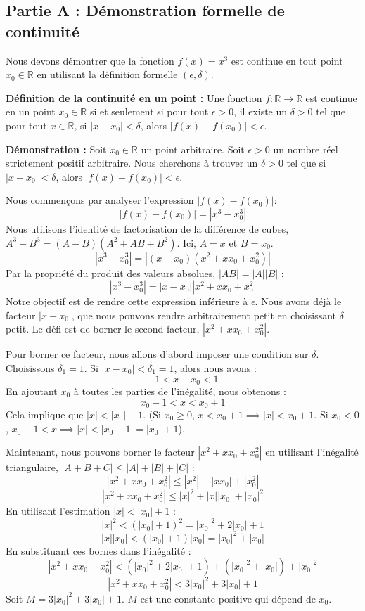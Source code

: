 \documentclass[12pt,a4paper]{report}
\begin{document}
\subsection{Partie A : Démonstration formelle de continuité}

Nous devons démontrer que la fonction $f(x) = x^3$ est continue en tout point $x_0 \in \mathbb{R}$ en utilisant la définition formelle $(\epsilon, \delta)$.

\textbf{Définition de la continuité en un point :}
Une fonction $f: \mathbb{R} \to \mathbb{R}$ est continue en un point $x_0 \in \mathbb{R}$ si et seulement si pour tout $\epsilon > 0$, il existe un $\delta > 0$ tel que pour tout $x \in \mathbb{R}$, si $|x - x_0| < \delta$, alors $|f(x) - f(x_0)| < \epsilon$.

\textbf{Démonstration :}
Soit $x_0 \in \mathbb{R}$ un point arbitraire.
Soit $\epsilon > 0$ un nombre réel strictement positif arbitraire. Nous cherchons à trouver un $\delta > 0$ tel que si $|x - x_0| < \delta$, alors $|f(x) - f(x_0)| < \epsilon$.

Nous commençons par analyser l'expression $|f(x) - f(x_0)|$:
$$ |f(x) - f(x_0)| = |x^3 - x_0^3| $$
Nous utilisons l'identité de factorisation de la différence de cubes, $A^3 - B^3 = (A - B)(A^2 + AB + B^2)$. Ici, $A=x$ et $B=x_0$.
$$ |x^3 - x_0^3| = |(x - x_0)(x^2 + x x_0 + x_0^2)| $$
Par la propriété du produit des valeurs absolues, $|AB| = |A||B|$ :
$$ |x^3 - x_0^3| = |x - x_0| |x^2 + x x_0 + x_0^2| $$
Notre objectif est de rendre cette expression inférieure à $\epsilon$. Nous avons déjà le facteur $|x - x_0|$, que nous pouvons rendre arbitrairement petit en choisissant $\delta$ petit. Le défi est de borner le second facteur, $|x^2 + x x_0 + x_0^2|$.

Pour borner ce facteur, nous allons d'abord imposer une condition sur $\delta$. Choisissons $\delta_1 = 1$.
Si $|x - x_0| < \delta_1 = 1$, alors nous avons :
$$ -1 < x - x_0 < 1 $$
En ajoutant $x_0$ à toutes les parties de l'inégalité, nous obtenons :
$$ x_0 - 1 < x < x_0 + 1 $$
Cela implique que $|x| < |x_0| + 1$. (Si $x_0 \ge 0$, $x < x_0+1 \implies |x| < x_0+1$. Si $x_0 < 0$, $x_0-1 < x \implies |x| < |x_0-1| = |x_0|+1$).

Maintenant, nous pouvons borner le facteur $|x^2 + x x_0 + x_0^2|$ en utilisant l'inégalité triangulaire, $|A+B+C| \le |A|+|B|+|C|$ :
$$ |x^2 + x x_0 + x_0^2| \le |x^2| + |x x_0| + |x_0^2| $$
$$ |x^2 + x x_0 + x_0^2| \le |x|^2 + |x||x_0| + |x_0|^2 $$
En utilisant l'estimation $|x| < |x_0| + 1$ :
$$ |x|^2 < (|x_0| + 1)^2 = |x_0|^2 + 2|x_0| + 1 $$
$$ |x||x_0| < (|x_0| + 1)|x_0| = |x_0|^2 + |x_0| $$
En substituant ces bornes dans l'inégalité :
$$ |x^2 + x x_0 + x_0^2| < (|x_0|^2 + 2|x_0| + 1) + (|x_0|^2 + |x_0|) + |x_0|^2 $$
$$ |x^2 + x x_0 + x_0^2| < 3|x_0|^2 + 3|x_0| + 1 $$
Soit $M = 3|x_0|^2 + 3|x_0| + 1$. $M$ est une constante positive qui dépend de $x_0$.
\end{document}
